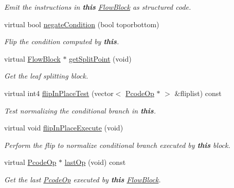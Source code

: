 \begin{DoxyCompactItemize}
\begin{DoxyCompactList}\small\item\em Emit the instructions in {\bfseries{this}} \mbox{\hyperlink{class_flow_block}{Flow\+Block}} as structured code. \end{DoxyCompactList}\item 
virtual bool \mbox{\hyperlink{class_block_condition_a2af1221f54ea05c5c8b25b4321f60705}{negate\+Condition}} (bool toporbottom)
\begin{DoxyCompactList}\small\item\em Flip the condition computed by {\bfseries{this}}. \end{DoxyCompactList}\item 
virtual \mbox{\hyperlink{class_flow_block}{Flow\+Block}} $\ast$ \mbox{\hyperlink{class_block_condition_a031007ca09262646abc489c6d5d29e50}{get\+Split\+Point}} (void)
\begin{DoxyCompactList}\small\item\em Get the leaf splitting block. \end{DoxyCompactList}\item 
virtual int4 \mbox{\hyperlink{class_block_condition_a586d47e72963c4e5f719f3673ef3743c}{flip\+In\+Place\+Test}} (vector$<$ \mbox{\hyperlink{class_pcode_op}{Pcode\+Op}} $\ast$ $>$ \&fliplist) const
\begin{DoxyCompactList}\small\item\em Test normalizing the conditional branch in {\bfseries{this}}. \end{DoxyCompactList}\item 
virtual void \mbox{\hyperlink{class_block_condition_a600c60c9af3b7ad9d7b8f58fa0f7ab5a}{flip\+In\+Place\+Execute}} (void)
\begin{DoxyCompactList}\small\item\em Perform the flip to normalize conditional branch executed by {\bfseries{this}} block. \end{DoxyCompactList}\item 
virtual \mbox{\hyperlink{class_pcode_op}{Pcode\+Op}} $\ast$ \mbox{\hyperlink{class_block_condition_acfde1060a17a2c40b1cb9edf90e69595}{last\+Op}} (void) const
\begin{DoxyCompactList}\small\item\em Get the last \mbox{\hyperlink{class_pcode_op}{Pcode\+Op}} executed by {\bfseries{this}} \mbox{\hyperlink{class_flow_block}{Flow\+Block}}. \end{DoxyCompactList}\item 

\end{DoxyCompactItemize}
